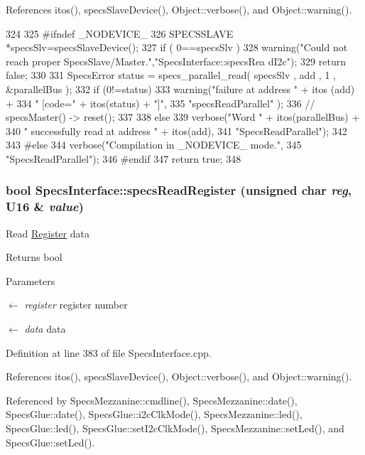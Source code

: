 References itos(), specsSlaveDevice(), Object::verbose(), and Object::warning().


\begin{DoxyCode}
324                                                       {
325 #ifndef _NODEVICE_
326   SPECSSLAVE *specsSlv=specsSlaveDevice();
327   if ( 0==specsSlv ){
328     warning("Could not reach proper SpecsSlave/Master.","SpecsInterface::specsRea
      dI2c");
329     return false;
330   }
331   SpecsError status = specs_parallel_read( specsSlv , add , 1 , &parallelBus );
332   if (0!=status){
333     warning("failure at address " + itos (add) +
334             " [code=" + itos(status) + "]",
335             "specsReadParallel" );
336     //    specsMaster() -> reset();
337   }
338   else {
339     verbose("Word " + itos(parallelBus) +
340             " successfully read at address " + itos(add),
341             "SpecsReadParallel");
342   }
343 #else
344   verbose("Compilation in _NODEVICE_ mode.",
345           "SpecsReadParallel");
346 #endif
347   return true;
348 }
\end{DoxyCode}
\hypertarget{classSpecsInterface_a87080bb575d1b9d0bb313c48e7d3f59a}{
\subsubsection[{specsReadRegister}]{\setlength{\rightskip}{0pt plus 5cm}bool SpecsInterface::specsReadRegister (unsigned char {\em reg}, \/  {\bf U16} \& {\em value})}}
\label{classSpecsInterface_a87080bb575d1b9d0bb313c48e7d3f59a}
Read \hyperlink{classRegister}{Register} data

\begin{DoxyReturn}{Returns}
bool 
\end{DoxyReturn}

\begin{DoxyParams}{Parameters}
\item[\mbox{$\leftarrow$} {\em register}]register number \item[\mbox{$\leftarrow$} {\em data}]data \end{DoxyParams}


Definition at line 383 of file SpecsInterface.cpp.

References itos(), specsSlaveDevice(), Object::verbose(), and Object::warning().

Referenced by SpecsMezzanine::cmdline(), SpecsMezzanine::date(), SpecsGlue::date(), SpecsGlue::i2cClkMode(), SpecsMezzanine::led(), SpecsGlue::led(), SpecsGlue::setI2cClkMode(), SpecsMezzanine::setLed(), and SpecsGlue::setLed().


